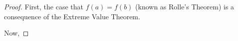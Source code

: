 

\begin{proof}
First, the case that $f(a)=f(b)$ (known as Rolle's Theorem) 
is a consequence of the Extreme Value Theorem.

Now, 
\end{proof}

